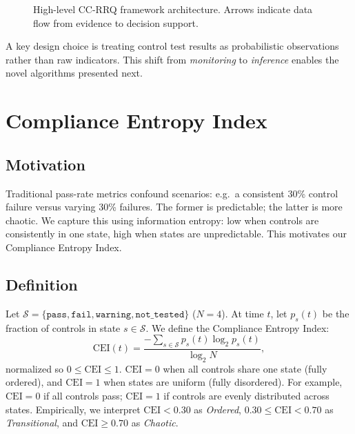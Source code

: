 \documentclass[conference]{IEEEtran}
\newcommand{\CEI}{\mathrm{CEI}}
\begin{document}
\begin{figure}[h]
  \centering
  \caption{High-level CC-RRQ framework architecture. Arrows indicate data flow from evidence to decision support.}
  \label{fig:architecture}
\end{figure}

A key design choice is treating control test results as probabilistic observations rather than raw indicators. This shift from \emph{monitoring} to \emph{inference} enables the novel algorithms presented next.

\section{Compliance Entropy Index}
\label{sec:cei}

\subsection{Motivation}
Traditional pass-rate metrics confound scenarios: e.g.\ a consistent 30\% control failure versus varying 30\% failures. The former is predictable; the latter is more chaotic. We capture this using information entropy: low when controls are consistently in one state, high when states are unpredictable. This motivates our Compliance Entropy Index.

\subsection{Definition}
Let $\mathcal{S} = \{\texttt{pass}, \texttt{fail}, \texttt{warning}, \texttt{not\_tested}\}$ ($N=4$). At time $t$, let $p_s(t)$ be the fraction of controls in state $s\in\mathcal{S}$. We define the Compliance Entropy Index:
\[
  \CEI(t) = \frac{-\sum_{s \in \mathcal{S}} p_s(t) \log_2 p_s(t)}{\log_2 N},
  \label{eq:cei}
\]
normalized so $0\le \CEI \le 1$. $\CEI=0$ when all controls share one state (fully ordered), and $\CEI=1$ when states are uniform (fully disordered). For example, $\CEI=0$ if all controls pass; $\CEI=1$ if controls are evenly distributed across states. Empirically, we interpret $\CEI<0.30$ as \emph{Ordered}, $0.30\le\CEI<0.70$ as \emph{Transitional}, and $\CEI\ge0.70$ as \emph{Chaotic}.
\end{document}
